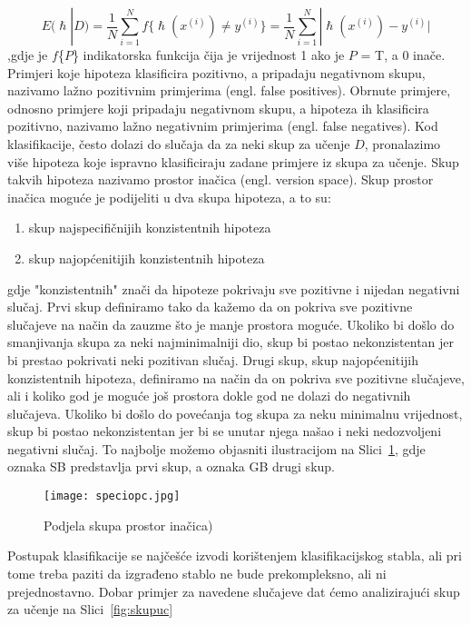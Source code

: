 \documentclass[times, utf8, zavrsni, numeric]{fer}
\begin{document}
\begin{equation}
E(\hslash|D)=\frac{1}{N}\sum_{i=1}^{N}f\{\hslash(x^{(i)})\neq y^{(i)}\} = \frac{1}{N}\sum_{i=1}^{N}|\hslash(x^{(i)}) - y^{(i)}|
\end{equation}
,gdje je $f$\{$P$\} indikatorska funkcija čija je vrijednost 1 ako je $P$ = T, a 0 inače. Primjeri koje hipoteza klasificira pozitivno, a pripadaju negativnom skupu, nazivamo lažno pozitivnim primjerima (engl. false positives). Obrnute primjere, odnosno primjere koji pripadaju negativnom skupu, a hipoteza ih klasificira pozitivno, nazivamo lažno negativnim primjerima (engl. false negatives). Kod klasifikacije, često dolazi do slučaja da za neki skup za učenje $D$, pronalazimo više hipoteza koje ispravno klasificiraju zadane primjere iz skupa za učenje. Skup takvih hipoteza nazivamo prostor inačica (engl. version space)\cite{skrip}. Skup prostor inačica moguće je podijeliti u dva skupa hipoteza, a to su: 
\begin{enumerate}
\item skup najspecifičnijih konzistentnih hipoteza
\item skup najopćenitijih konzistentnih hipoteza
\end{enumerate}
gdje "konzistentnih" znači da hipoteze pokrivaju sve pozitivne i nijedan negativni slučaj. Prvi skup definiramo tako da kažemo da on pokriva sve pozitivne slučajeve na način da zauzme što je manje prostora moguće. Ukoliko bi došlo do smanjivanja skupa za neki najminimalniji dio, skup bi postao nekonzistentan jer bi prestao pokrivati neki pozitivan slučaj. Drugi skup, skup najopćenitijih konzistentnih hipoteza, definiramo na način da on pokriva sve pozitivne slučajeve, ali i koliko god je moguće još prostora dokle god ne dolazi do negativnih slučajeva. Ukoliko bi došlo do povećanja tog skupa za neku minimalnu vrijednost, skup bi postao nekonzistentan jer bi se unutar njega našao i neki nedozvoljeni negativni slučaj. To najbolje možemo objasniti ilustracijom na Slici~\ref{fig:speciopc}, gdje oznaka SB predstavlja prvi skup, a oznaka GB drugi skup. 

\begin{figure}[H]
\centering
\texttt{[image: speciopc.jpg]}
\caption{Podjela skupa prostor inačica)\cite{skrip}}
\label{fig:speciopc}
\end{figure}


Postupak klasifikacije se najčešće izvodi korištenjem klasifikacijskog stabla, ali pri tome treba paziti da izgrađeno stablo ne bude prekompleksno, ali ni prejednostavno. Dobar primjer za navedene slučajeve dat ćemo analizirajući skup za učenje na Slici~\ref{fig:skupuc}
\end{document}
